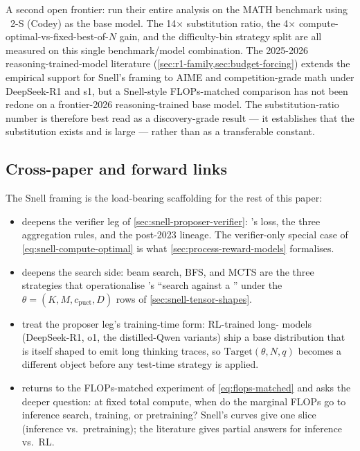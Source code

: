 A second open frontier: \citet[\S 4--6]{snell2024} run their entire
analysis on the MATH benchmark using ~2-S\* (Codey) as the base
model. The 14$\times$ substitution ratio, the 4$\times$
compute-optimal-vs-fixed-best-of-$N$ gain, and the difficulty-bin
strategy split are all measured on this single benchmark/model
combination. The 2025-2026 reasoning-trained-model literature
(\cref{sec:r1-family,sec:budget-forcing}) extends the empirical
support for Snell's framing to AIME and competition-grade math under
DeepSeek-R1 and s1, but a Snell-style FLOPs-matched comparison has not
been redone on a frontier-2026 reasoning-trained base model. The
substitution-ratio number is therefore best read as a discovery-grade
result --- it establishes that the substitution exists and is large ---
rather than as a transferable constant.

\subsection{Cross-paper and forward links}
\label{sec:snell-forward}

The Snell framing is the load-bearing scaffolding for the rest of this
paper:
\begin{itemize}
\item {} deepens the verifier leg of
\cref{sec:snell-proposer-verifier}: \citet{lightman2023-prm800k}'s 
loss, the three aggregation rules, and the post-2023  lineage. The
verifier-only special case of
\cref{eq:snell-compute-optimal} is what
\cref{sec:process-reward-models} formalises.
\item {} deepens the search side: beam search, BFS,
and MCTS are the three strategies that operationalise
\citet[\S 5.2]{snell2024}'s ``search against a '' under the
$\theta = (K, M, c_\text{puct}, D)$ rows of
\cref{sec:snell-tensor-shapes}.
\item {} treat the proposer leg's
training-time form: RL-trained long- models (DeepSeek-R1, o1, the
distilled-Qwen variants) ship a base distribution that is itself
shaped to emit long thinking traces, so $\mathrm{Target}(\theta, N, q)$
becomes a different object before any test-time strategy is applied.
\item {} returns to the FLOPs-matched experiment
of \cref{eq:flops-matched} and asks the deeper question: at fixed total
compute, when do the marginal FLOPs go to inference search, 
training, or pretraining? Snell's curves give one slice
(inference vs.\ pretraining); the  literature gives partial
answers for inference vs.\ RL.
\end{itemize}

